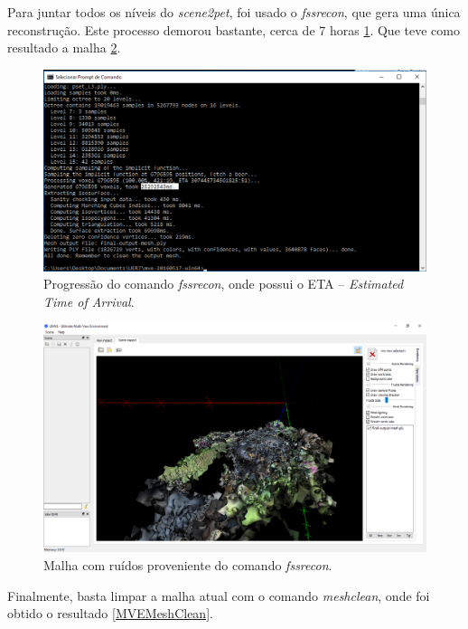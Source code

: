 Para juntar todos os níveis do \emph{scene2pet}, foi usado o \emph{fssrecon}, que gera uma única reconstrução. Este processo demorou bastante, cerca de 7 horas \ref{fig:MVEFSSR}. Que teve como resultado a malha \ref{fig:MVEFSSRMesh}.

\begin{figure}[!h]
	\centering
	\includegraphics[width=0.8\linewidth]{figs/mvemeshtempo2.png}
	\caption{%
	Progressão do comando \emph{fssrecon}, onde possui o ETA -- \emph{Estimated Time of Arrival}.
	}\label{fig:MVEFSSR}
\end{figure} 

\begin{figure}[!h]
	\centering
	\includegraphics[width=1\linewidth]{figs/mvemeshout.png}
	\caption{%
	Malha com ruídos proveniente do comando \emph{fssrecon}.
	}\label{fig:MVEFSSRMesh}
\end{figure} 

Finalmente, basta limpar a malha atual com o comando \emph{meshclean}, onde foi obtido o resultado \ref{MVEMeshClean}.

